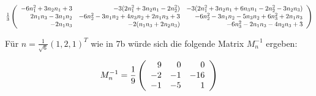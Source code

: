 \documentclass[main.tex]{subfiles}
\begin{document}
\begin{center}
    \footnotesize
    $\frac{1}{3} \eqmatrix{rrr}{
    -6 n_1^2 +3 n_2 n_1 +3 & -3 (2 n_1^2 + 3 n_2 n_1 - 2 n_2^2)               & -3 (2 n_1^2 + 3 n_2 n_1 + 6 n_3 n_1 - 2 n_2^2 - 3 n_2 n_3) \\
     2 n_1 n_3 - 3 n_1 n_2 & -6 n_2^2 - 3 n_1 n_2 + 4 n_3 n_2 + 2 n_1 n_3 + 3 & -6 n_2^2 - 3 n_1 n_2 - 5 n_3 n_2 + 6 n_3^2 + 2 n_1 n_3 \\
                -2 n_1 n_3 & -2 (n_1 n_3 + 2 n_2 n_3)                         & -6 n_3^2 - 2 n_1 n_3 - 4 n_2 n_3 + 3
}$
\end{center}


Für $n = \frac{1}{\sqrt{6}} (1, 2, 1)^T$ wie in 7b würde sich die folgende Matrix $M_n^{-1}$ ergeben:

$$
    M_n^{-1} = \frac{1}{9} \eqmatrix{rrr}{
        9 & 0  & 0 \\
       -2 & -1 & -16 \\
       -1 & -5 & 1 \\
    }
$$
\end{document}
